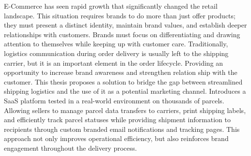 E-Commerce has seen rapid growth that significantly changed the retail landscape.
This situation requires brands to do more than just offer products; they must present
a distinct identity, maintain brand values, and establish deeper relationships with customers. 
Brands must focus on differentiating and drawing attention to themselves while keeping up with customer care.
Traditionally, logistics communication during order delivery is usually left to the shipping carrier, but it is an important element in the order lifecycle.
Providing an opportunity to increase brand awareness and strengthen relation ship with the customer.
This thesis proposes a solution to bridge the gap between streamlined shipping logistics and the use of it as a potential marketing channel. 
Introduces a SaaS platform tested in a real-world environment on thousands of parcels. 
Allowing sellers to manage parcel data transfers to carriers, print shipping labels, and efficiently track parcel statuses while providing shipment information to recipients through custom branded email notifications and tracking pages.
This approach not only improves operational efficiency, but also reinforces brand engagement throughout the delivery process.
